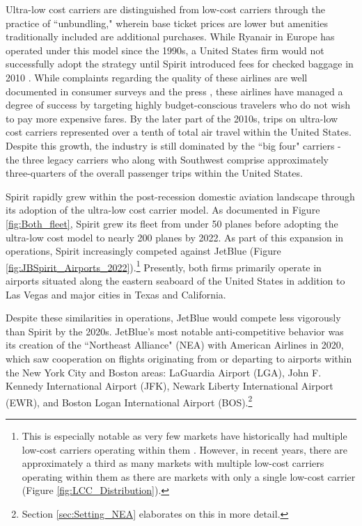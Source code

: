 \documentclass{article}
\begin{document}
	Ultra-low cost carriers are distinguished from low-cost carriers through the practice of ``unbundling," wherein base ticket prices are lower but amenities traditionally included are additional purchases. While Ryanair in Europe has operated under this model since the 1990s, a United States firm would not successfully adopt the strategy until Spirit introduced fees for checked baggage in 2010 \citep{bachwich_emergence_2017}. While complaints regarding the quality of these airlines are well documented in consumer surveys and the press \citep{vasel_spirit_2016, elliott_jetblue_2022}, these airlines have managed a degree of success by targeting highly budget-conscious travelers who do not wish to pay more expensive fares. By the later part of the 2010s, trips on ultra-low cost carriers represented over a tenth of total air travel within the United States.  Despite this growth, the industry is still dominated by the ``big four" carriers - the three legacy carriers who along with Southwest comprise approximately three-quarters of the overall passenger trips within the United States. 

    Spirit rapidly grew within the post-recession domestic aviation landscape through its adoption of the ultra-low cost carrier model. As documented in Figure \ref{fig:Both_fleet}, Spirit grew its fleet from under 50 planes before adopting the ultra-low cost model to nearly 200 planes by 2022. As part of this expansion in operations, Spirit increasingly competed against JetBlue (Figure \ref{fig:JBSpirit_Airports_2022}).\footnote{This is especially notable as very few markets have historically had multiple low-cost carriers operating within them \citep{kwoka_fringe_2016, ciliberto_market_2021}. However, in recent years, there are approximately a third as many markets with multiple low-cost carriers operating within them as there are markets with only a single low-cost carrier (Figure \ref{fig:LCC_Distribution}).} Presently, both firms primarily operate in airports situated along the eastern seaboard of the United States in addition to Las Vegas and major cities in Texas and California.

    
	Despite these similarities in operations, JetBlue would compete less vigorously than Spirit by the 2020s.  JetBlue's most notable anti-competitive behavior was its creation of the ``Northeast Alliance" (NEA) with American Airlines in 2020, which saw cooperation on flights originating from or departing to airports within the New York City and Boston areas: LaGuardia Airport (LGA), John F. Kennedy International Airport (JFK), Newark Liberty International Airport (EWR), and Boston Logan International Airport (BOS).\footnote{Section \ref{sec:Setting_NEA} elaborates on this in more detail.} 
	
\end{document}
